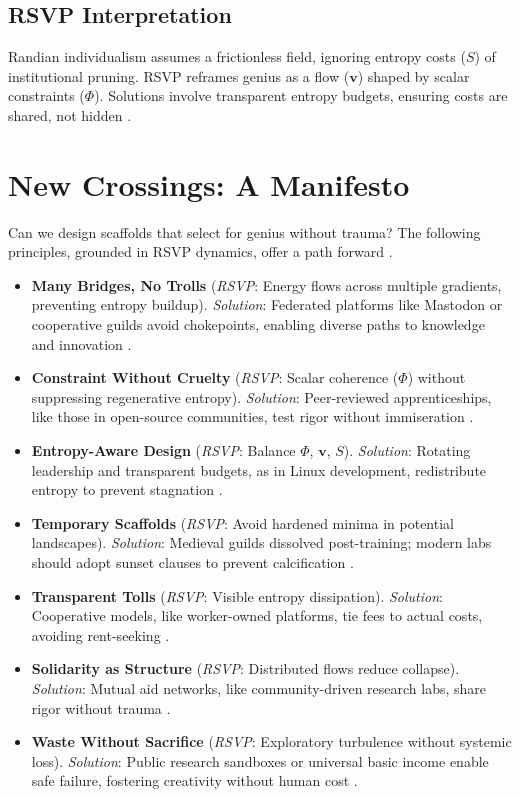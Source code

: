 \documentclass[12pt]{article}
\begin{document}
\subsection{RSVP Interpretation}
Randian individualism assumes a frictionless field, ignoring entropy costs ($S$) of institutional pruning. RSVP reframes genius as a flow ($\mathbf{v}$) shaped by scalar constraints ($\Phi$). Solutions involve transparent entropy budgets, ensuring costs are shared, not hidden \citep{graeber2021dawn}.

\section{New Crossings: A Manifesto}
Can we design scaffolds that select for genius without trauma? The following principles, grounded in RSVP dynamics, offer a path forward \citep{hesse1969glass, strugatsky2016doomed}.

\begin{itemize}
    \item \textbf{Many Bridges, No Trolls} (\textit{RSVP}: Energy flows across multiple gradients, preventing entropy buildup). \textit{Solution}: Federated platforms like Mastodon or cooperative guilds avoid chokepoints, enabling diverse paths to knowledge and innovation \citep{doctorow2023internet}.
    \item \textbf{Constraint Without Cruelty} (\textit{RSVP}: Scalar coherence ($\Phi$) without suppressing regenerative entropy). \textit{Solution}: Peer-reviewed apprenticeships, like those in open-source communities, test rigor without immiseration \citep{henrich2016secret}.
    \item \textbf{Entropy-Aware Design} (\textit{RSVP}: Balance $\Phi$, $\mathbf{v}$, $S$). \textit{Solution}: Rotating leadership and transparent budgets, as in Linux development, redistribute entropy to prevent stagnation \citep{doctorow2023internet}.
    \item \textbf{Temporary Scaffolds} (\textit{RSVP}: Avoid hardened minima in potential landscapes). \textit{Solution}: Medieval guilds dissolved post-training; modern labs should adopt sunset clauses to prevent calcification \citep{graeber2021dawn}.
    \item \textbf{Transparent Tolls} (\textit{RSVP}: Visible entropy dissipation). \textit{Solution}: Cooperative models, like worker-owned platforms, tie fees to actual costs, avoiding rent-seeking \citep{giblin2022chokepoint}.
    \item \textbf{Solidarity as Structure} (\textit{RSVP}: Distributed flows reduce collapse). \textit{Solution}: Mutual aid networks, like community-driven research labs, share rigor without trauma \citep{henrich2016secret}.
    \item \textbf{Waste Without Sacrifice} (\textit{RSVP}: Exploratory turbulence without systemic loss). \textit{Solution}: Public research sandboxes or universal basic income enable safe failure, fostering creativity without human cost \citep{graeber2021dawn}.
\end{itemize}
\end{document}
